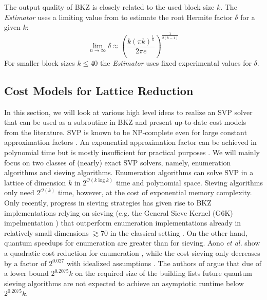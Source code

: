 The output quality of BKZ is closely related to the used block size $k$. The \textit{Estimator} uses a limiting value from \cite{Chen13} to estimate the root Hermite factor $\delta$ for a given $k$:
\begin{equation}
  \lim_{n\rightarrow \infty} \delta \approx \left( \frac{k (\pi k)^{\frac{1}{k}}}{2\pi e}\right)^{\frac{1}{2(k-1)}}
\end{equation}
For smaller block sizes $k\leq 40$ the \textit{Estimator} uses fixed experimental values for $\delta$.





\subsection{Cost Models for Lattice Reduction} \label{sec:costmodels}
In this section, we will look at various high level ideas to realize an SVP solver that can be used as a subroutine in BKZ and present up-to-date cost models from the literature. SVP is known to be NP-complete even for large constant approximation factors \cite{Ajt98, Khot05}. An exponential approximation factor can be achieved in polynomial time but is mostly insufficient for practical purposes \cite{LLL82}.  We will mainly focus on two classes of (nearly) exact SVP solvers, namely, enumeration algorithms and sieving algorithms. Enumeration algorithms can solve SVP in a lattice of dimension $k$ in $2^{\mathcal{O}(k \log k)}$ time and polynomial space. Sieving algorithms only need $2^{\mathcal{O}(k)}$ time, however, at the cost of exponential memory complexity. Only recently, progress in sieving strategies has given rise to BKZ implementations relying on sieving (e.g. the General Sieve Kernel (G6K) impelmentation \cite{ADHKPS19, DSW21}) that outperform enumeration implementations already in relatively small dimensions $\gtrsim 70$ in the classical setting \cite{ABLR21}. On the other hand, quantum speedups for enumeration are greater than for sieving. Aono \textit{et al.} show a quadratic cost reduction for enumeration \citet{ANS18}, while the cost sieving only decreases by a factor of $2^0.027$ with idealized assumptions \cite{Laa15}. The authors of \cite{ADPS16} argue that due of a lower bound $2^0.2075k$ on the required size of the building lists future quantum sieving algorithms are not expected to achieve an asymptotic runtime below $2^0.2075k$. %

